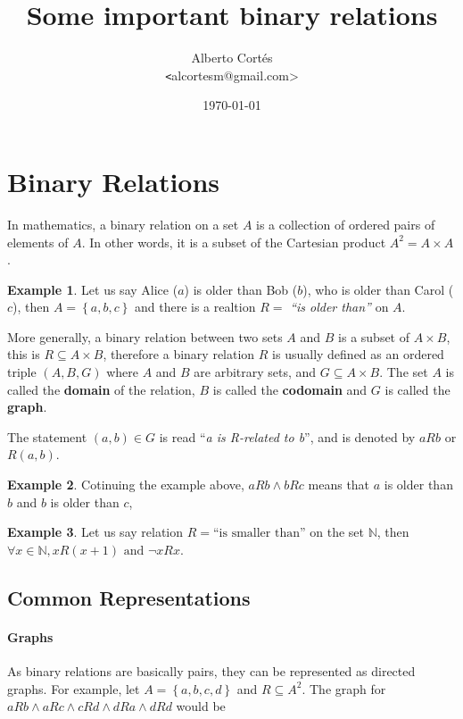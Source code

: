 \documentclass[11pt]{article}
\title{Some important binary relations}
\author{Alberto Cortés \\ {\texttt <alcortesm@gmail.com>}}
\date{\today}
\theoremstyle{plain}
\theoremstyle{definition}
\newtheorem*{example}{Example}
\begin{document}
\maketitle

\section{Binary Relations}

In mathematics, a binary relation on a set $A$ is a collection of ordered pairs of elements of $A$.
In other words, it is a subset of the Cartesian product $A^2 = A \times A$.

\begin{example}
  Let us say Alice ($a$) is older than Bob ($b$), who is older than Carol ($c$),
  then $A = \left\{a, b, c\right\}$ and
  there is a realtion $R =$ \textsl{``is older than''} on $A$.
\end{example}

More generally, a binary relation between two sets $A$ and $B$ is a subset of $A \times B$,
this is $R \subseteq A \times B$,
therefore a binary relation $R$ is usually defined as an ordered triple $(A, B, G)$
where $A$ and $B$ are arbitrary sets, and $G \subseteq A \times B$.
The set $A$ is called the \textbf{domain} of the relation,
$B$ is called the \textbf{codomain} and
$G$ is called the \textbf{graph}.

The statement $(a,b) \in G$ is read ``\textsl{a is R-related to b}'',
and is denoted by $aRb$ or $R(a,b)$.

\begin{example}
  Cotinuing the example above,
  $aRb \land bRc$ means that
  $a$ is older than $b$ and
  $b$ is older than $c$,
\end{example}

\begin{example}
  Let us say relation $R = \text{``is smaller than''}$ on the set $\mathbb{N}$,
  then $\forall x \in \mathbb{N}, xR(x+1) \text{ and } \neg xRx$.
\end{example}


\subsection{Common Representations}

\paragraph{Graphs} As binary relations are basically pairs,
they can be represented as directed graphs.
For example,
let $A = \left\{a, b, c, d\right\}$ and $R \subseteq A^2$.
The graph for $aRb \land aRc \land cRd \land dRa \land dRd$ would be
\begin{center}
  
\end{center}
\end{document}
